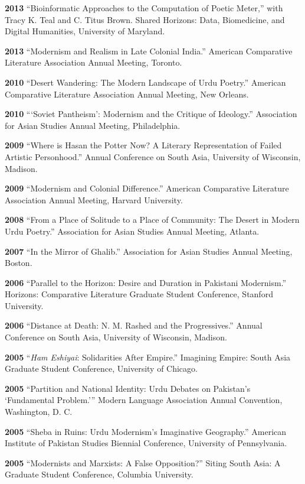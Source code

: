 \documentclass[letterpaper,12pt]{article}
\begin{document}
\textbf{2013}
“Bioinformatic Approaches to the Computation of Poetic Meter,”
with Tracy K. Teal and C. Titus Brown.
Shared Horizons: Data, Biomedicine, and Digital Humanities, University of Maryland.

\textbf{2013}
“Modernism and Realism in Late Colonial India.”
American Comparative Literature Association Annual Meeting, Toronto.

\textbf{2010}
“Desert Wandering: The Modern Landscape of Urdu Poetry.”
American Comparative Literature Association Annual Meeting, New Orleans.

\textbf{2010}
“‘Soviet Pantheism’: Modernism and the Critique of Ideology.”
Association for Asian Studies Annual Meeting, Philadelphia.

\textbf{2009}
“Where is Hasan the Potter Now? A Literary Representation of Failed Artistic Personhood.”
Annual Conference on South Asia, University of Wisconsin, Madison.

\textbf{2009}
“Modernism and Colonial Difference.”
American Comparative Literature Association Annual Meeting, Harvard University.

\textbf{2008}
“From a Place of Solitude to a Place of Community: The Desert in Modern Urdu Poetry.”
Association for Asian Studies Annual Meeting, Atlanta.

\textbf{2007}
“In the Mirror of Ghalib.”
Association for Asian Studies Annual Meeting, Boston.

\textbf{2006}
“Parallel to the Horizon: Desire and Duration in Pakistani Modernism.”
Horizons: Comparative Literature Graduate Student Conference, Stanford University.

\textbf{2006}
“Distance at Death: N. M. Rashed and the Progressives.”
Annual Conference on South Asia, University of Wisconsin, Madison.

\textbf{2005}
“\emph{Ham Eshiyai}: Solidarities After Empire.”
Imagining Empire: South Asia Graduate Student Conference, University of Chicago.

\textbf{2005}
“Partition and National Identity: Urdu Debates on Pakistan’s ‘Fundamental Problem.’”
Modern Language Association Annual Convention, Washington, D. C.

\textbf{2005}
“Sheba in Ruins: Urdu Modernism’s Imaginative Geography.”
American Institute of Pakistan Studies Biennial Conference, University of Pennsylvania.

\textbf{2005}
“Modernists and Marxists: A False Opposition?”
Siting South Asia: A Graduate Student Conference, Columbia University.
\end{document}
